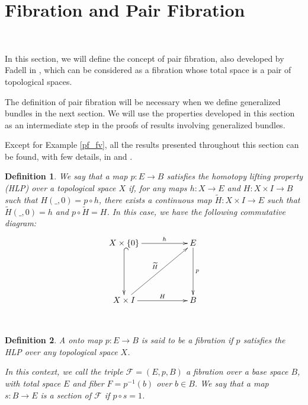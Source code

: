 \documentclass[12pt,oneside]{book}
\newtheorem{defi}   {Definition}[chapter]
\newcommand{\wt}{\widetilde}
\begin{document}
    \section{Fibration and Pair Fibration}\label{secao_fib_pares}

    \

    In this section, we will define the concept of pair fibration, also developed by Fadell in \cite{fadell_1}, 
    which can be considered as a fibration whose total space is a pair of topological spaces.

    The definition of pair fibration will be necessary when we define generalized bundles in the next section. We 
    will use the properties developed in this section as an intermediate step in the proofs of results involving generalized bundles.
    
    Except for Example \ref{pf_fv}, all the results presented throughout this section can be found, with few details, in \cite{fadell_1} and 
    \cite{brown}.
    
    \begin{defi}\label{PLH}
        We say that a map $p:E\to B$ satisfies the homotopy lifting property (HLP) over a topological space 
        $X$ if, for any maps $h:X\to E$ and $H:X\times I\to B$ such that $H(\_,0)=p\circ h$, there exists a continuous map 
        $\wt{H}:X\times I\to E$ such that $\wt{H}(\_,0)=h$ and $p\circ\wt{H}=H$. In this case, we have the following commutative diagram: 
        $$ \xymatrix @C=0.5cm {
            X\times \{ 0 \} \ar[rrr]^-{h} \ar@{^(->}[dd] &&& E \ar[dd]^-{p} \\
            &&& \\
            X\times I \ar[rrr]^-{H} \ar[rrruu]^-{\wt{H}} &&& B
        }$$
    \end{defi}

    \
    
    \begin{defi}
        A onto map $p:E\to B$ is said to be a fibration if $p$ satisfies the HLP over any topological space $X$.
    
        In this context, we call the triple $\mathcal{F}=(E,p,B)$ a fibration over a base space $B$, with total space $E$ and fiber 
        $F=p^{-1}(b)$ over $b\in B$. We say that a map $s:B\to E$ is a section of $\mathcal{F}$ if $p\circ s=1$.
    \end{defi}
    
\end{document}
